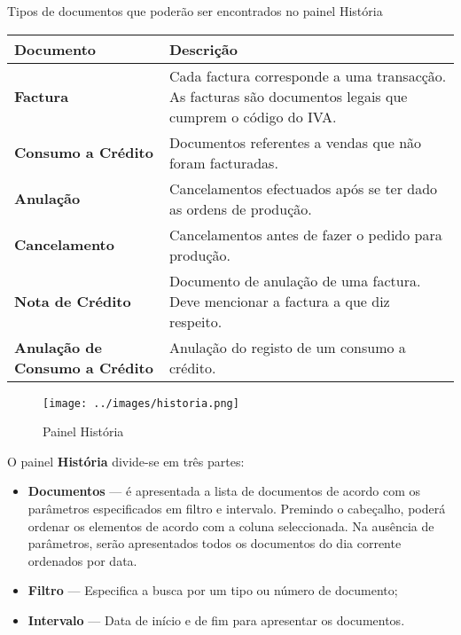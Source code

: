 \documentclass[a4paper,11pt,openany]{memoir}
\begin{document}
Tipos de documentos que poderão ser encontrados no painel História



\begin{table}[ht]
 \centering
\small
\def\arraystretch{1.5}
 \begin{tabular}{p{4cm} p{11cm}}  %
 \textbf{Documento} & \textbf{Descrição}  \\ %
 \hline
\textbf{Factura} & Cada factura corresponde a uma transacção. As facturas são documentos legais que cumprem o código do IVA. \\
\textbf{Consumo a Crédito} & Documentos referentes a vendas que não foram facturadas. \\
\textbf{Anulação} & Cancelamentos efectuados após se ter dado as ordens de produção. \\
\textbf{Cancelamento} & Cancelamentos antes de fazer o pedido para produção. \\
\textbf{Nota de Crédito} &  Documento de anulação de uma factura. Deve mencionar a factura a que diz respeito. \\
\textbf{Anulação de Consumo a Crédito} & Anulação do registo de um consumo a crédito. \\
 \hline
 \end{tabular}
 \end{table}





\begin{figure}[h]
\begin{center}
\texttt{[image: ../images/historia.png]}
\caption[Submanifold]{Painel História}
\label{fig:historia}
\end{center}
\end{figure}


O painel \textbf{História} divide-se em três partes:
\begin{itemize}
\item \textbf{Documentos} --- é apresentada a lista de documentos de acordo com os parâmetros especificados em filtro e intervalo. Premindo o cabeçalho, 
poderá ordenar os elementos de acordo com a coluna seleccionada. Na ausência de parâmetros, 
serão apresentados todos os documentos do dia corrente ordenados por data.
\item \textbf{Filtro} --- Especifica a busca por um tipo ou número de documento;
\item \textbf{Intervalo} --- Data de início e de fim para apresentar os documentos.
\end{itemize}
\end{document}
